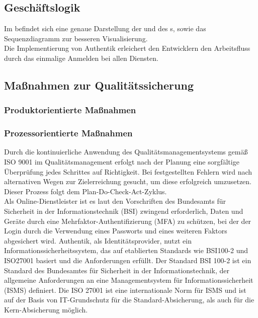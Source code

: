 \subsection{Geschäftslogik}
\label{sec:Geschaeftslogik}
Im  befindet sich eine genaue Darstellung der  und des s, 
sowie das Sequenzdiagramm zur besseren Visualisierung. 
\\Die Implementierung von Authentik erleichert den Entwicklern den Arbeitsfluss durch das einmalige Anmelden bei allen Diensten.

\subsection{Maßnahmen zur Qualitätssicherung}
\label{sec:Qualitaetssicherung}

\subsubsection{Produktorientierte Maßnahmen}
\label{sec:ProduktorientierteMaßnahmen}

\subsubsection{Prozessorientierte Maßnahmen}
\label{sec:ProzessorientierteMaßnahmen}
Durch die kontinuierliche Anwendung des Qualitätsmanagementsystems gemäß ISO 9001 im Qualitätsmanagement erfolgt nach der Planung 
eine sorgfältige Überprüfung jedes Schrittes auf Richtigkeit. Bei festgestellten Fehlern wird nach alternativen Wegen zur 
Zielerreichung gesucht, um diese erfolgreich umzusetzen. Dieser Prozess folgt dem Plan-Do-Check-Act-Zyklus.
\\Als Online-Dienstleister ist es laut den Vorschriften des Bundesamts für Sicherheit in der Informationstechnik (BSI) 
zwingend erforderlich, Daten und Geräte durch eine Mehrfaktor-Authentifizierung (\acs{MFA}) zu schützen, bei der der Login durch 
die Verwendung eines Passworts und eines weiteren Faktors abgesichert wird. Authentik, als Identitätsprovider, nutzt ein 
Informationssicherheitssystem, das auf etablierten Standards wie BSI100-2 und ISO27001 basiert und die Anforderungen erfüllt.
Der Standard BSI 100-2 ist ein Standard des Bundesamtes für Sicherheit in der Informationstechnik, der allgemeine Anforderungen 
an eine Managementsystem für Informationssicherheit (\acs{ISMS}) definiert. Die ISO 27001 ist eine internationale Norm für \acs{ISMS} 
und ist auf der Basis von IT-Grundschutz für die Standard-Absicherung, als auch für die Kern-Absicherung möglich.